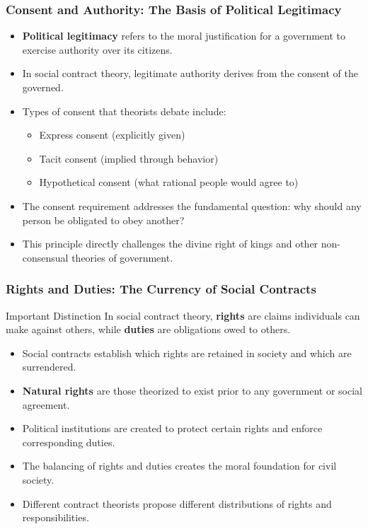 \documentclass[aspectratio=169]{beamer}
\begin{document}
\begin{frame}
  \frametitle{Consent and Authority: The Basis of Political Legitimacy}
  
  \begin{itemize}
    \item \textbf{Political legitimacy} refers to the moral justification for a government to exercise authority over its citizens.
    \item In social contract theory, legitimate authority derives from the consent of the governed.
    \item Types of consent that theorists debate include:
      \begin{itemize}
        \item Express consent (explicitly given)
        \item Tacit consent (implied through behavior)
        \item Hypothetical consent (what rational people would agree to)
      \end{itemize}
    \item The consent requirement addresses the fundamental question: why should any person be obligated to obey another?
    \item This principle directly challenges the divine right of kings and other non-consensual theories of government.
  \end{itemize}
\end{frame}

\begin{frame}
  \frametitle{Rights and Duties: The Currency of Social Contracts}
  
  \begin{alertblock}{Important Distinction}
    In social contract theory, \textbf{rights} are claims individuals can make against others, while \textbf{duties} are obligations owed to others.
  \end{alertblock}
  
  \begin{itemize}
    \item Social contracts establish which rights are retained in society and which are surrendered.
    \item \textbf{Natural rights} are those theorized to exist prior to any government or social agreement.
    \item Political institutions are created to protect certain rights and enforce corresponding duties.
    \item The balancing of rights and duties creates the moral foundation for civil society.
    \item Different contract theorists propose different distributions of rights and responsibilities.
  \end{itemize}
\end{frame}
\end{document}

